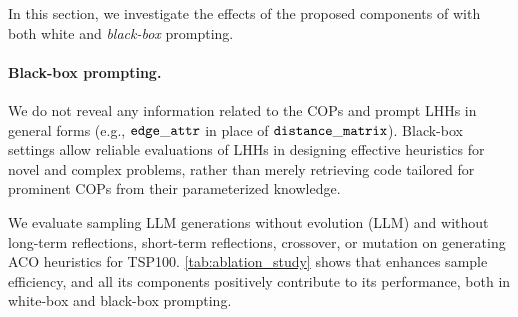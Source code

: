 In this section, we investigate the effects of the proposed components of \our{} with both white and \textit{black-box} prompting.

\paragraph{Black-box prompting. } We do not reveal any information related to the COPs and prompt LHHs in general forms (e.g., $\tt edge\_attr$ in place of $\tt distance\_matrix$). Black-box settings allow reliable evaluations of LHHs in designing effective heuristics for novel and complex problems, rather than merely retrieving code tailored for prominent COPs from their parameterized knowledge.


\begin{table}
    \vspace{-3mm}
    \footnotesize
    \caption{Ablation study of \our{} components with both white and black-box prompting.}
    \label{tab:ablation_study}
\end{table} 


We evaluate sampling LLM generations without evolution (LLM) and \our{} without long-term reflections, short-term reflections, crossover, or mutation on generating ACO heuristics for TSP100.  \cref{tab:ablation_study} shows that \our{} enhances sample efficiency, and all its components positively contribute to its performance, both in white-box and black-box prompting.



